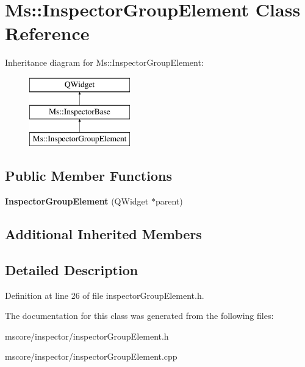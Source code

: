 \hypertarget{class_ms_1_1_inspector_group_element}{}\section{Ms\+:\+:Inspector\+Group\+Element Class Reference}
\label{class_ms_1_1_inspector_group_element}
Inheritance diagram for Ms\+:\+:Inspector\+Group\+Element\+:\begin{figure}[H]
\begin{center}
\leavevmode
\includegraphics[height=3.000000cm]{class_ms_1_1_inspector_group_element}
\end{center}
\end{figure}
\subsection*{Public Member Functions}
\begin{DoxyCompactItemize}
\item 
\mbox{\label{class_ms_1_1_inspector_group_element_a7f9b8f9f2e55b4984870cb51632df4eb}} 
{\bfseries Inspector\+Group\+Element} (Q\+Widget $\ast$parent)
\end{DoxyCompactItemize}
\subsection*{Additional Inherited Members}


\subsection{Detailed Description}


Definition at line 26 of file inspector\+Group\+Element.\+h.



The documentation for this class was generated from the following files\+:\begin{DoxyCompactItemize}
\item 
mscore/inspector/inspector\+Group\+Element.\+h\item 
mscore/inspector/inspector\+Group\+Element.\+cpp\end{DoxyCompactItemize}
